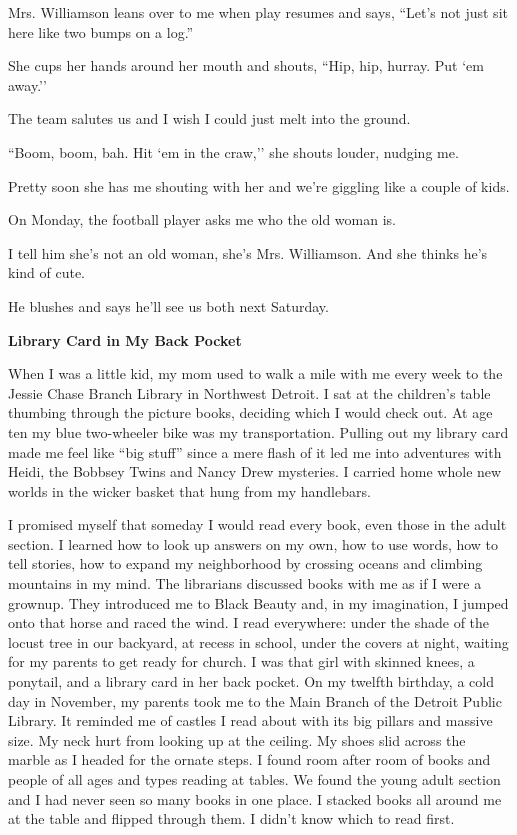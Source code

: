 \documentclass[
]{article}
\begin{document}
Mrs. Williamson leans over to me when play resumes and says, ``Let's not
just sit here like two bumps on a log.''

She cups her hands around her mouth and shouts, ``Hip, hip, hurray. Put
`em away.''

The team salutes us and I wish I could just melt into the ground.

``Boom, boom, bah. Hit `em in the craw,'' she shouts louder, nudging me.

Pretty soon she has me shouting with her and we're giggling like a
couple of kids.

On Monday, the football player asks me who the old woman is.

I tell him she's not an old woman, she's Mrs. Williamson. And she thinks
he's kind of cute.

He blushes and says he'll see us both next Saturday.

\textbf{\hfill\break
}

\textbf{Library Card in My Back Pocket}

When I was a little kid, my mom used to walk a mile with me every week
to the Jessie Chase Branch Library in Northwest Detroit. I sat at the
children's table thumbing through the picture books, deciding which I
would check out. At age ten my blue two-wheeler bike was my
transportation. Pulling out my library card made me feel like ``big
stuff'' since a mere flash of it led me into adventures with Heidi, the
Bobbsey Twins and Nancy Drew mysteries. I carried home whole new worlds
in the wicker basket that hung from my handlebars.

I promised myself that someday I would read every book, even those in
the adult section. I learned how to look up answers on my own, how to
use words, how to tell stories, how to expand my neighborhood by
crossing oceans and climbing mountains in my mind. The librarians
discussed books with me as if I were a grownup. They introduced me to
Black Beauty and, in my imagination, I jumped onto that horse and raced
the wind. I read everywhere: under the shade of the locust tree in our
backyard, at recess in school, under the covers at night, waiting for my
parents to get ready for church. I was that girl with skinned knees, a
ponytail, and a library card in her back pocket. On my twelfth birthday,
a cold day in November, my parents took me to the Main Branch of the
Detroit Public Library. It reminded me of castles I read about with its
big pillars and massive size. My neck hurt from looking up at the
ceiling. My shoes slid across the marble as I headed for the ornate
steps. I found room after room of books and people of all ages and types
reading at tables. We found the young adult section and I had never seen
so many books in one place. I stacked books all around me at the table
and flipped through them. I didn't know which to read first.
\end{document}
